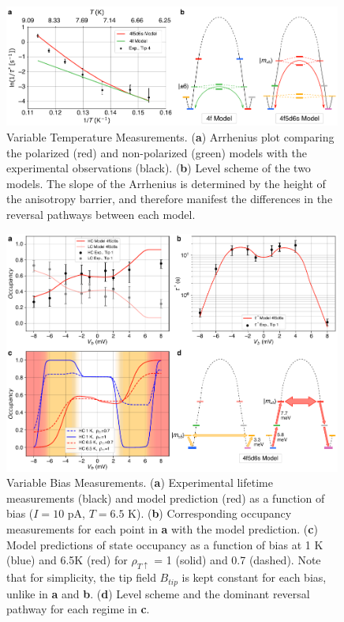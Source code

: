 \documentclass[
reprint,amsmath,amssymb,aps]{revtex4-2}
\begin{document}
\begin{figure}[h!]
\includegraphics[width=0.99\textwidth]{Fig3_new.pdf}
\caption{Variable Temperature Measurements. (\textbf{a}) Arrhenius plot comparing the polarized (red) and non-polarized (green) models with the experimental observations (black). (\textbf{b}) Level scheme of the two models. The slope of the Arrhenius is determined by the height of the anisotropy barrier, and therefore manifest the differences in the reversal pathways between each model. 
\label{fig:temp} }
\end{figure}

\begin{figure}[ht!]
\includegraphics[width=0.99\textwidth]{Fig4_new.pdf}
\caption{Variable Bias Measurements. (\textbf{a}) Experimental lifetime measurements (black) and model prediction (red) as a function of bias ($I = 10$ pA, $T = 6.5$ K). (\textbf{b}) Corresponding occupancy measurements for each point in \textbf{a} with the model prediction. (\textbf{c}) Model predictions of state occupancy as a function of bias at 1 K (blue) and 6.5K (red) for $\rho_{T \uparrow}$ = 1 (solid) and 0.7 (dashed). Note that for simplicity, the tip field $B_{tip}$ is kept constant for each bias, unlike in \textbf{a} and \textbf{b}. (\textbf{d}) Level scheme and the dominant reversal pathway for each regime in \textbf{c}.   
\label{fig:bias} }
\end{figure}
\end{document}

